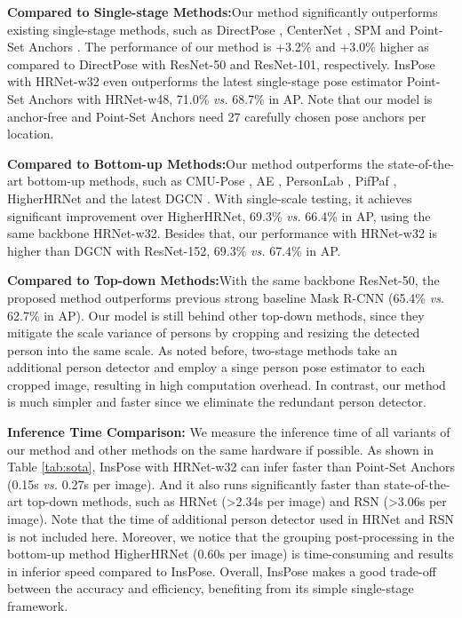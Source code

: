 \documentclass[sigconf]{acmart}
\begin{document}
\textbf{Compared to Single-stage Methods:}\quad Our method significantly outperforms existing single-stage methods, such as DirectPose \cite{tian2019directpose}, CenterNet \cite{zhou2019objects}, SPM \cite{nie2019single} and Point-Set Anchors \cite{wei2020point}. The performance of our method is +3.2\% and +3.0\% higher as compared to DirectPose \cite{tian2019directpose} with ResNet-50 and ResNet-101, respectively. InsPose with HRNet-w32 even outperforms the latest single-stage pose estimator Point-Set Anchors \cite{wei2020point} with HRNet-w48, 71.0\% \textit{vs.} 68.7\% in AP. Note that our model is anchor-free and Point-Set Anchors need 27 carefully chosen pose anchors per location.

\textbf{Compared to Bottom-up Methods:}\quad Our method outperforms the state-of-the-art bottom-up methods, such as CMU-Pose \cite{cao2017realtime}, AE \cite{newell2016associative}, PersonLab \cite{papandreou2018personlab}, PifPaf \cite{kreiss2019pifpaf}, HigherHRNet \cite{cheng2020higherhrnet} and the latest DGCN \cite{qiu2020dgcn}. With single-scale testing, it achieves significant improvement over HigherHRNet, 69.3\% \textit{vs.} 66.4\% in AP, using the same backbone HRNet-w32. Besides that, our performance with HRNet-w32 is higher than DGCN \cite{qiu2020dgcn} with ResNet-152, 69.3\% \textit{vs.} 67.4\% in AP.

\textbf{Compared to Top-down Methods:}\quad With the same backbone ResNet-50, the proposed method outperforms previous strong baseline Mask R-CNN (65.4\% \textit{vs.} 62.7\% in AP). Our model is still behind other top-down methods, since they mitigate the scale variance of persons by cropping and resizing the detected person into the same scale. As noted before, two-stage methods take an additional person detector and employ a singe person pose estimator to each cropped image, resulting in high computation overhead. In contrast, our method is much simpler and faster since we eliminate the redundant person detector.

\textbf{Inference Time Comparison:}\quad
We measure the inference time of all variants of our method and other methods on the same hardware if possible.
As shown in Table \ref{tab:sota},
InsPose with HRNet-w32 can infer faster than Point-Set Anchors \cite{wei2020point} (0.15s \textit{vs.} 0.27s per image).
And it also runs significantly faster than state-of-the-art top-down methods, such as HRNet \cite{sun2019deep} (>2.34s per image) and RSN \cite{cai2020learning} (>3.06s per image).
Note that the time of additional person detector used in HRNet and RSN is not included here.
Moreover, we notice that the grouping post-processing in the bottom-up method HigherHRNet \cite{cheng2020higherhrnet} (0.60s per image) is time-consuming and results in inferior speed compared to InsPose.
Overall, InsPose makes a good trade-off between the accuracy and efficiency, benefiting from its simple single-stage framework.
\end{document}
